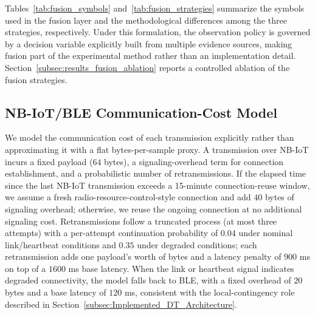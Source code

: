 \documentclass{ieeeaccess}
\begin{document}
Tables~\ref{tab:fusion_symbols} and~\ref{tab:fusion_strategies} summarize the symbols used in the fusion layer and the methodological differences among the three strategies, respectively. Under this formulation, the observation policy is governed by a decision variable explicitly built from multiple evidence sources, making fusion part of the experimental method rather than an implementation detail. Section~\ref{subsec:results_fusion_ablation} reports a controlled ablation of the fusion strategies.

\subsection{NB-IoT/BLE Communication-Cost Model}
\label{subsec:network_cost}
We model the communication cost of each transmission explicitly rather than approximating it with a flat bytes-per-sample proxy. A transmission over NB-IoT incurs a fixed payload ($64$ bytes), a signaling-overhead term for connection establishment, and a probabilistic number of retransmissions. If the elapsed time since the last NB-IoT transmission exceeds a 15-minute connection-reuse window, we assume a fresh radio-resource-control-style connection and add $40$ bytes of signaling overhead; otherwise, we reuse the ongoing connection at no additional signaling cost. Retransmissions follow a truncated process (at most three attempts) with a per-attempt continuation probability of $0.04$ under nominal link/heartbeat conditions and $0.35$ under degraded conditions; each retransmission adds one payload's worth of bytes and a latency penalty of $900$ ms on top of a $1600$ ms base latency. When the link or heartbeat signal indicates degraded connectivity, the model falls back to BLE, with a fixed overhead of $20$ bytes and a base latency of $120$ ms, consistent with the local-contingency role described in Section~\ref{subsec:Implemented_DT_Architecture}.
\end{document}
